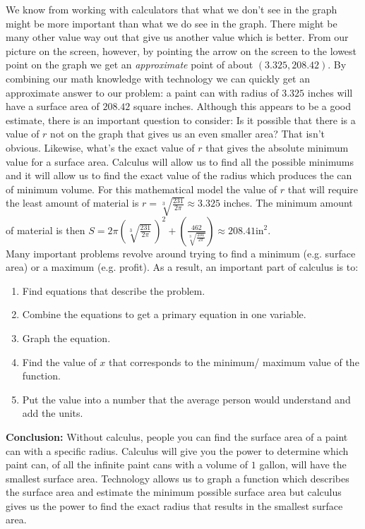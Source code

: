 \documentclass[12pt]{article}
\begin{document}
We know from working with calculators that what we don't see in 
the graph might be more important than what we do 
see in the graph. There might be many other value way out that 
give us another value which is better. From our picture 
on the screen, however, by pointing the arrow on the screen to the 
lowest point on the graph we get an {\em approximate} point of 
about $(3.325, 208.42)$. By combining our math knowledge with 
technology we can quickly get an approximate answer to our 
problem: a paint can with radius of $3.325$ inches will have a 
surface area of $208.42$ square inches.
Although this appears to be a good estimate, there is an important 
question to consider:
Is it possible that there is a value of $r$ not on the graph that 
gives us an even smaller area? That isn't obvious.
Likewise, what's the exact value of $r$ that gives the absolute 
minimum value for a surface area.
Calculus will allow us to find all the possible minimums and it will 
allow us to find the exact value of the radius which produces the 
can of minimum volume. For this mathematical
model the value of $r$ that will require the least amount of 
material is $r=\sqrt[3]{\frac{231}{2\pi}} \approx 3.325$
inches. The minimum amount of material is then $S=2\pi \left( \sqrt[3]{\frac{231}{2\pi}}\, \right)^2+\left(\frac{462}{\sqrt
[3]{\frac{231}{2\pi}}}\right) \approx 208.41 \mbox{in}^2$.\\

Many important problems revolve around trying to find a minimum 
(e.g. surface area) or a maximum
(e.g. profit). As a result, an important part of calculus is to:
\begin{enumerate}
\item Find equations that describe the problem.
\item Combine the equations to get a primary equation in one 
variable.
\item Graph the equation.
\item Find the value of $x$ that corresponds to the minimum/
maximum value of the function.
\item Put the value into a number that the average person would 
understand and add the units.
\end{enumerate}
\textbf{Conclusion:} 
Without calculus, people you can find the surface area of a paint 
can with a specific radius. Calculus will give you the power to
determine which paint can, of all the infinite paint cans with 
a volume of $1$ gallon, will have the smallest surface area. 
Technology allows us to graph a function which describes the 
surface area and estimate the minimum possible surface
area but calculus gives us the power to find the exact radius that 
results in the smallest surface area. 
\end{document}
